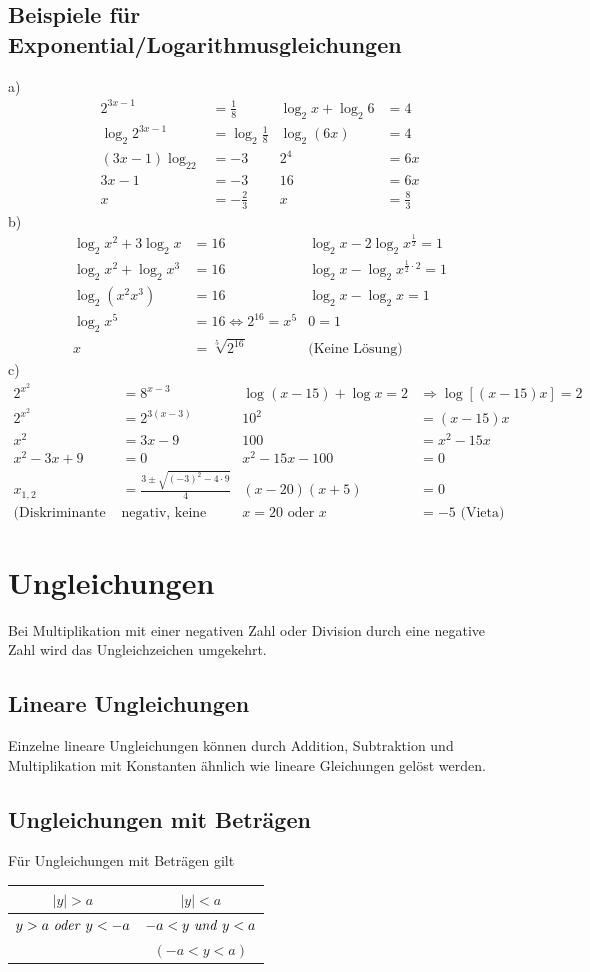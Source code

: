 \documentclass[a4paper]{article}
\begin{document}
\subsection{Beispiele für Exponential/Logarithmusgleichungen}
a) \begin{align*}
2^{3x-1}&=\frac{1}{8} & \log_2x + \log_2 6 &=4 \\
\log_2 2^{3x-1}&=\log_2 \frac{1}{8} & \log_2{(6x)} &= 4 \\
(3x-1)\log_22&=-3 & 2^4 &= 6x \\
3x-1&=-3 & 16 &= 6x \\
x&=-\frac{2}{3} & x &=\frac{8}{3}
\end{align*}
b) \begin{align*}
\log_2x^2+3\log_2x&=16 & \log_2x-2\log_2x^\frac{1}{2} = 1 \\
\log_2x^2+\log_2x^3&=16 & \log_2x-\log_2x^{\frac{1}{2}\cdot2} = 1  \\
\log_2{(x^2x^3)} &= 16 & \log_2x-\log_2x=1 \\
\log_2x^5&=16 \Leftrightarrow 2^{16} = x^5 & 0 = 1 \\
x&=\sqrt[5]{2^{16}} & \text{(Keine Lösung)}
\end{align*}
c)
\begin{align*}
2^{x^2} &= 8^{x-3} & \log{(x-15)} + \log x =2 &\Rightarrow \log{[(x-15)x]}=2\\
2^{x^2} &= 2^{3(x-3)} & 10^2 &= (x-15)x \\
x^2 &= 3x-9 & 100&=x^2-15x\\
x^2-3x+9 &= 0 & x^2-15x-100&=0\\
x_{1,2}&=\frac{3\pm\sqrt{{(-3)}^2-4\cdot9}}{4} & (x-20)(x+5)&=0 \\
\text{(Diskriminante } &\text{negativ, keine Lösung)} & x=20 \text{ oder } x&=-5 \text{ (Vieta)}
\end{align*}

\section{Ungleichungen}
Bei Multiplikation mit einer negativen Zahl oder Division durch eine negative Zahl wird das Ungleichzeichen umgekehrt.
\subsection{Lineare Ungleichungen}
Einzelne lineare Ungleichungen können durch Addition, Subtraktion und Multiplikation mit Konstanten ähnlich wie lineare Gleichungen gelöst werden.
\subsection{Ungleichungen mit Beträgen}
Für Ungleichungen mit Beträgen gilt
\begin{center}
\begin{tabular}{c | c}
$|y|>a$ & $|y|<a$ \\
\hline
$y>a \text{ \emph{oder} } y<-a$ & $-a<y \text{ \emph{und} } y<a$  \\
& $(-a<y<a)$
\end{tabular}
\end{center}
\end{document}
